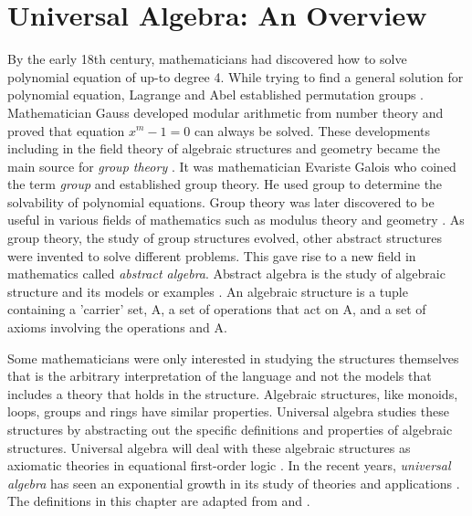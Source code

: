 \chapter{Universal Algebra: An Overview}
By the early 18th century, mathematicians had discovered how to solve polynomial
equation of up-to degree 4. While trying to find a general solution for
polynomial equation, Lagrange and Abel established permutation groups
\cite{barnett2017roots}. Mathematician Gauss developed modular arithmetic from
number theory and proved that equation $x^{m}-1=0$ can always be solved. These
developments including in the field theory of algebraic structures and geometry
became the main source for \textit{group theory} \cite{enwiki:1145792803}. It
was mathematician Evariste Galois who coined the term \emph{group} and
established group theory. He used group to determine the solvability of
polynomial equations. Group theory was later discovered to be useful in various
fields of mathematics such as modulus theory and geometry
\cite{enwiki:1107380309}. As group theory, the study of group structures
evolved, other abstract structures were invented to solve different problems.
This gave rise to a new field in mathematics called \emph{abstract algebra}.
Abstract algebra is the study of algebraic structure and its models or examples
\cite{enwiki:1107380309}. An algebraic structure is a tuple containing a
'carrier' set, A, a set of operations that act on A, and a set of axioms
involving the operations and A. 

Some mathematicians were only interested in studying the structures themselves
that is the arbitrary interpretation of the language and not the models that
includes a theory that holds in the structure. Algebraic structures, like
monoids, loops, groups and rings have similar properties. Universal algebra
studies these structures by abstracting out the specific definitions and
properties of algebraic structures. Universal algebra will deal with these
algebraic structures as axiomatic theories in equational first-order logic
\cite{YSharoda}. In the recent years, \emph{universal algebra} has seen an
exponential growth in its study of theories and applications
\cite{sankappanavar1981course}. The definitions in this chapter are adapted from
\cite{sankappanavar1981course} and \cite{abstractAlgebra}.

